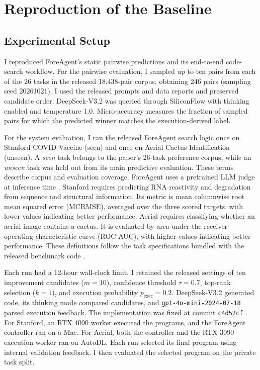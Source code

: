 \section{Reproduction of the Baseline}
\label{sec:reproduction}

\subsection{Experimental Setup}
I reproduced ForeAgent's static pairwise predictions and its end-to-end code-search workflow. For the pairwise evaluation, I sampled up to ten pairs from each of the 26 tasks in the released 18,438-pair corpus, obtaining 246 pairs (sampling seed 20261021). I used the released prompts and data reports and preserved candidate order. DeepSeek-V3.2 was queried through SiliconFlow with thinking enabled and temperature 1.0. Micro-accuracy measures the fraction of sampled pairs for which the predicted winner matches the execution-derived label.

For the system evaluation, I ran the released ForeAgent search logic once on Stanford COVID Vaccine (seen) and once on Aerial Cactus Identification (unseen). A \emph{seen} task belongs to the paper's 26-task preference corpus, while an \emph{unseen} task was held out from its main predictive evaluation. These terms describe corpus and evaluation coverage. ForeAgent uses a pretrained LLM judge at inference time \citep[Appendices~B.1 and B.3]{zheng2026predict}. Stanford requires predicting RNA reactivity and degradation from sequence and structural information. Its metric is mean columnwise root mean squared error (MCRMSE), averaged over the three scored targets, with lower values indicating better performance. Aerial requires classifying whether an aerial image contains a cactus. It is evaluated by area under the receiver operating characteristic curve (ROC AUC), with higher values indicating better performance. These definitions follow the task specifications bundled with the released benchmark code \citep{foreagentcode}.

Each run had a 12-hour wall-clock limit. I retained the released settings of ten improvement candidates ($m=10$), confidence threshold $\tau=0.7$, top-rank selection ($k=1$), and execution probability $p_{\mathrm{exec}}=0.2$. DeepSeek-V3.2 generated code, its thinking mode compared candidates, and \texttt{gpt-4o-mini-2024-07-18} parsed execution feedback. The implementation was fixed at commit \texttt{c4d52cf} \citep{foreagentcode}. For Stanford, an RTX 4090 worker executed the programs, and the ForeAgent controller ran on a Mac. For Aerial, both the controller and the RTX 3090 execution worker ran on AutoDL. Each run selected its final program using internal validation feedback. I then evaluated the selected program on the private task split.

